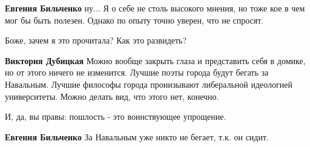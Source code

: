 \begin{itemize}
\begin{itemize}
\textbf{Евгения Бильченко} ну... Я о себе не столь высокого мнения, но тоже кое
в чем мог бы быть полезен. Однако по опыту точно уверен, что не спросят.

\end{itemize}

 
Боже, зачем я это прочитала? Как это развидеть?

\begin{itemize}
 
\textbf{Виктория Дубицкая} Можно вообще закрыть глаза и представить себя в
домике, но от этого ничего не изменится. Лучшие поэты города будут бегать за
Навальным. Лучшие философы города пронизывают либеральной идеологией
университеты. Можно делать вид, что этого нет, конечно.

 
И, да, вы правы: пошлость - это воинствующее упрощение.

 
\textbf{Евгения Бильченко} За Навальным уже никто не бегает, т.к. он сидит.
\end{itemize}

\end{itemize}

